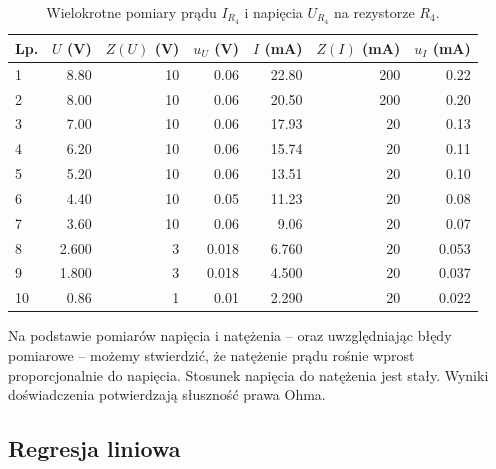 \documentclass[a4paper]{article}
\begin{document}
\begin{table}
\centering
\begin{tabular}{lrrrrrr}
\toprule
Lp. &  $U$ (V) &  $Z(U)$ (V) &  $u_U$ (V) &  $I$ (mA) &  $Z(I)$ (mA) &  $u_I$ (mA) \\
\midrule
1 &          8.80  &                10 &                 0.06  &             22.80  &                 200 &                     0.22 \\
2 &          8.00  &                10 &                 0.06  &             20.50  &                 200 &                     0.20 \\
3 &          7.00  &                10 &                 0.06  &             17.93 &                  20 &                     0.13 \\
4 &          6.20  &                10 &                 0.06  &             15.74 &                  20 &                     0.11 \\
5 &          5.20  &                10 &                 0.06  &             13.51 &                  20 &                     0.10 \\
6 &          4.40  &                10 &                 0.05  &             11.23 &                  20 &                     0.08 \\
7 &          3.60  &                10 &                 0.06  &              9.06 &                  20 &                     0.07 \\
8 &          2.600  &                 3 &                 0.018 &              6.760 &                  20 &                     0.053 \\
9 &          1.800  &                 3 &                 0.018 &              4.500 &                  20 &                     0.037 \\
10 &         0.86 &                 1 &                 0.01 &              2.290 &                  20 &                     0.022 \\
\bottomrule
\end{tabular}
\caption{Wielokrotne pomiary prądu $I_{R_4}$ i napięcia $U_{R_4}$ na rezystorze $R_4$.}
\end{table}

Na podstawie pomiarów napięcia i natężenia -- oraz uwzględniając błędy pomiarowe -- możemy stwierdzić, że natężenie prądu rośnie wprost proporcjonalnie do napięcia.
Stosunek napięcia do natężenia jest stały.
Wyniki doświadczenia potwierdzają słuszność prawa Ohma.

\subsection{Regresja liniowa}
\end{document}
